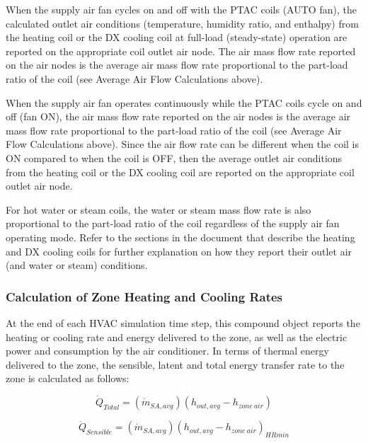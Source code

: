 When the supply air fan cycles on and off with the PTAC coils (AUTO fan), the calculated outlet air conditions (temperature, humidity ratio, and enthalpy) from the heating coil or the DX cooling coil at full-load (steady-state) operation are reported on the appropriate coil outlet air node. The air mass flow rate reported on the air nodes is the average air mass flow rate proportional to the part-load ratio of the coil (see Average Air Flow Calculations above).

When the supply air fan operates continuously while the PTAC coils cycle on and off (fan ON), the air mass flow rate reported on the air nodes is the average air mass flow rate proportional to the part-load ratio of the coil (see Average Air Flow Calculations above). Since the air flow rate can be different when the coil is ON compared to when the coil is OFF, then the average outlet air conditions from the heating coil or the DX cooling coil are reported on the appropriate coil outlet air node.

For hot water or steam coils, the water or steam mass flow rate is also proportional to the part-load ratio of the coil regardless of the supply air fan operating mode. Refer to the sections in the document that describe the heating and DX cooling coils for further explanation on how they report their outlet air (and water or steam) conditions.

\subsubsection{Calculation of Zone Heating and Cooling Rates}\label{calculation-of-zone-heating-and-cooling-rates}

At the end of each HVAC simulation time step, this compound object reports the heating or cooling rate and energy delivered to the zone, as well as the electric power and consumption by the air conditioner. In terms of thermal energy delivered to the zone, the sensible, latent and total energy transfer rate to the zone is calculated as follows:

\begin{equation}
  \dot{Q}_{Total} = \left( \dot{m}_{SA,avg} \right) \left( h_{out,avg} - h_{zone~air} \right)
\end{equation}

\begin{equation}
  \dot{Q}_{Sensible} = \left( \dot{m}_{SA,avg} \right) \left( h_{out,avg} - h_{zone~air} \right)_{HRmin}
\end{equation}

